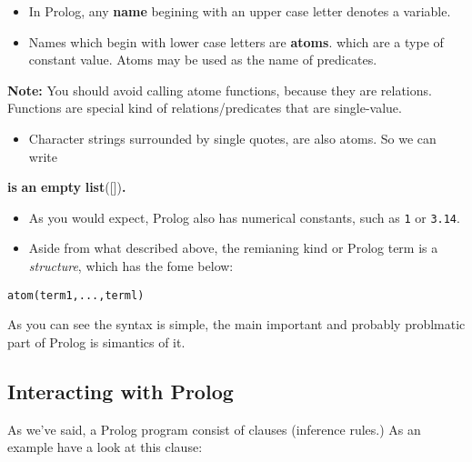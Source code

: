 \documentclass[11pt]{article}
\providecommand{\tightlist}{%
      \setlength{\itemsep}{0pt}\setlength{\parskip}{0pt}}
\newenvironment{Shaded}{}{}
\newcommand{\KeywordTok}[1]{\textcolor[rgb]{0.00,0.44,0.13}{\textbf{{#1}}}}
\newcommand{\StringTok}[1]{\textcolor[rgb]{0.25,0.44,0.63}{{#1}}}
\newcommand{\AlertTok}[1]{\textcolor[rgb]{1.00,0.00,0.00}{\textbf{{#1}}}}
\newcommand{\ErrorTok}[1]{\textcolor[rgb]{1.00,0.00,0.00}{\textbf{{#1}}}}
\newcommand{\NormalTok}[1]{{#1}}
\begin{document}
\begin{itemize}
\item
  In Prolog, any \textbf{name} begining with an upper case letter
  denotes a variable.
\item
  Names which begin with lower case letters are \textbf{atoms}. which
  are a type of constant value. Atoms may be used as the name of
  predicates.
\end{itemize}

\textbf{Note:} You should avoid calling atome functions, because they
are relations. Functions are special kind of relations/predicates that
are single-value.

\begin{itemize}
\tightlist
\item
  Character strings surrounded by single quotes, are also atoms. So we
  can write
\end{itemize}

\begin{Shaded}
\begin{Highlighting}[]
\StringTok{\textquotesingle{}}\ErrorTok{is}\AlertTok{ }\ErrorTok{an}\AlertTok{ }\ErrorTok{empty}\AlertTok{ }\ErrorTok{list}\StringTok{\textquotesingle{}}\NormalTok{([])}\KeywordTok{.}
\end{Highlighting}
\end{Shaded}

\begin{itemize}
\item
  As you would expect, Prolog also has numerical constants, such as
  \texttt{1} or \texttt{3.14}.
\item
  Aside from what described above, the remianing kind or Prolog term is
  a \emph{structure}, which has the fome below:
\end{itemize}

\begin{verbatim}
atom(term1,...,terml)
\end{verbatim}

As you can see the syntax is simple, the main important and probably
problmatic part of Prolog is simantics of it.

\hypertarget{interacting-with-prolog}{%
\subsection{Interacting with Prolog}\label{interacting-with-prolog}}

As we've said, a Prolog program consist of clauses (inference rules.) As
an example have a look at this clause:
\end{document}
